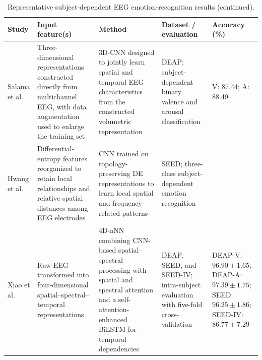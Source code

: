 \documentclass{WileyMSP-template}
\newcommand{\lightrowsep}{%
    \arrayrulecolor{lightrowgray}%
    \specialrule{0.30pt}{3.5pt}{3.5pt}%
    \arrayrulecolor{black}%
}
\begin{document}
\begin{table}

\addtocounter{table}{-1}

\centering

\caption{Representative subject-dependent EEG emotion-recognition results
(continued).}

\scriptsize
\setlength{\tabcolsep}{3.0pt}
\renewcommand{\arraystretch}{1.18}

\begin{tabularx}{\textheight}{
>{\raggedright\arraybackslash}p{3.15cm}
>{\raggedright\arraybackslash}X
>{\raggedright\arraybackslash}X
>{\raggedright\arraybackslash}p{3.65cm}
>{\raggedright\arraybackslash}p{5.15cm}}

\toprule

\textbf{Study} &
\textbf{Input feature(s)} &
\textbf{Method} &
\textbf{Dataset / evaluation} &
\textbf{Accuracy (\%)} \\

\midrule

Salama et al. \cite{salama2018_3dcnn} &
Three-dimensional representations constructed directly from multichannel EEG,
with data augmentation used to enlarge the training set &
3D-CNN designed to jointly learn spatial and temporal EEG characteristics
from the constructed volumetric representation &
DEAP; subject-dependent binary valence and arousal classification &
V: 87.44;
A: 88.49 \\

\lightrowsep

Hwang et al. \cite{hwang2020_decnn} &
Differential-entropy features reorganized to retain local relationships
and relative spatial distances among EEG electrodes &
CNN trained on topology-preserving DE representations
to learn local spatial and frequency-related patterns &
SEED; three-class subject-dependent emotion recognition &
90.41 \\

\lightrowsep

Xiao et al. \cite{xiao2022_4dann} &
Raw EEG transformed into four-dimensional spatial--spectral--temporal representations &
4D-aNN combining CNN-based spatial--spectral processing with spatial
and spectral attention and a self-attention-enhanced BiLSTM
for temporal dependencies &
DEAP, SEED, and SEED-IV; intra-subject evaluation with five-fold cross-validation &
DEAP-V: $96.90 \pm 1.65$;
DEAP-A: $97.39 \pm 1.75$;
SEED: $96.25 \pm 1.86$;
SEED-IV: $86.77 \pm 7.29$ \\


\end{tabularx}
\end{table}
\end{document}
